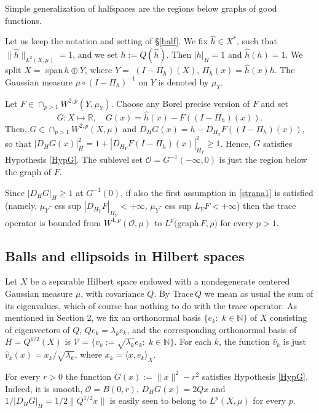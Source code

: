 \documentclass[reqno,twoside,12pt]{amsart}
\begin{document}
Simple generalization of halfspaces  are the regions below graphs of good functions. 

Let us keep the notation and setting of \S \ref{half}. We fix $\hat{h}\in X^*$,  such that $\|\hat{h}\|_{L^2(X, \mu)} =1$, and  we set  $h := Q(\hat{h})$. Then  $|h|_H=1$ and $\hat{h}(h)=1$. We split $X = $  span$\,h \oplus Y$, where $Y=$ $ (I-\Pi_h)(X)$, $\Pi_h(x) = \hat{h}(x)h$. The Gaussian measure $\mu\circ (I-\Pi_h)^{-1}$ on $Y$ is denoted by $\mu_Y$. 

Let $F\in \cap_{p>1}W^{2,p}(Y, \mu_Y)$. Choose any Borel precise version of $F$ and set 
$$G:X\mapsto {\mathbb R}, \quad G(x) = \hat{h}(x) - F( (I-\Pi_h)(x)). $$
Then, $G\in \cap_{p>1}W^{2,p}(X, \mu)$ and $D_HG(x) = h - D_{H_Y}F((I-\Pi_h)(x))$, so that $|D_HG(x)|_H^2 = 1+|D_{H_Y}F(I-\Pi_h)(x)|_{H_Y}^2\geq 1$. Hence, $G$ satisfies Hypothesis \ref{HypG}. The sublevel set ${\mathcal O}=G^{-1}(-\infty, 0)$ is just the region below the graph of $F$. 

 

Since $|D_HG|_H \geq 1$ at $G^{-1}(0)$, if also the first assumption in \eqref{strana1} is satisfied (namely, 
$\mu_Y$- ess sup $|D_{H_{Y}}F|_{H_Y} <+\infty$, $\mu_Y$- ess sup $L_YF <+\infty$) then the trace operator is bounded from $W^{1,p}({\mathcal O}, \mu)$ to $L^p($graph$\,F, \rho)$ for every $p>1$. 

\subsection{Balls and ellipsoids in Hilbert spaces}

Let $X$ be a separable Hilbert space endowed with a nondegenerate centered Gaussian measure $\mu$, with covariance $Q$. By Trace$\,Q$ we mean as usual the sum of its eigenvalues, which of course has nothing to do with the trace operator. As mentioned in Section 2, we fix an orthonormal  basis $\{e_k:\;k\in {\mathbb N}\}$ of $X$  consisting of  eigenvectors of $Q$, $Qe_k= \lambda_ke_k$, and the corresponding orthonormal basis of $H= Q^{1/2}(X)$ is $\mathcal{V} = \{v_k:= \sqrt{\lambda_k}e_k:\;k\in {\mathbb N}\}$. For each $k$, the function $\hat{v}_k$ is just $\hat{v}_k(x) = x_k/\sqrt{\lambda_k} $, where $x_k =\langle x, e_k\rangle_X$. 

  
For every $r>0$ the function $G(x) := \|x\|^2 - r^2$ satisfies Hypothesis \ref{HypG}. Indeed, it is smooth, ${\mathcal O} = B(0,r)$, $D_HG(x) =2Qx$ and $1/|D_HG|_H = 1/2\|Q^{1/2}x\|$ is easily seen to belong to   $L^p(X, \mu)$ for every $p$. 
\end{document}

